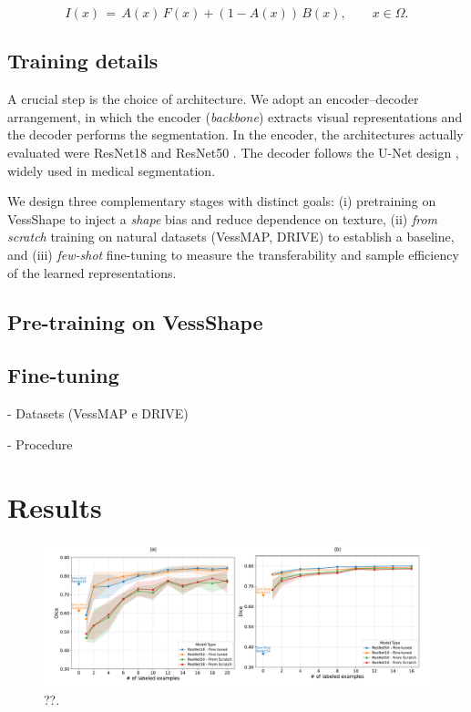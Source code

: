 \documentclass[%
reprint,
nofootinbib,
 amsmath,amssymb,
aps,
superscriptaddress,
showkeys,
longbibliography
]{revtex4-1}
\begin{document}
\begin{equation}
I(x) \,=\, A(x)\,F(x) + (1-A(x))\,B(x), \qquad x \in \Omega.
\label{eq:compose}
\end{equation}





\subsection{Training details}

A crucial step is the choice of architecture. We adopt an encoder–decoder arrangement, in which the encoder (\emph{backbone}) extracts visual representations and the decoder performs the segmentation. In the encoder, the architectures actually evaluated were ResNet18 and ResNet50 \cite{}. The decoder follows the U-Net design \cite{}, widely used in medical segmentation.

We design three complementary stages with distinct goals: (i) pretraining on VessShape to inject a \emph{shape} bias and reduce dependence on texture, (ii) \emph{from scratch} training on natural datasets (VessMAP, DRIVE) to establish a baseline, and (iii) \emph{few-shot} fine-tuning to measure the transferability and sample efficiency of the learned representations.

\subsection{Pre-training on VessShape}




\subsection{Fine-tuning}

- Datasets (VessMAP e DRIVE)

- Procedure

\section{Results}
\label{s:results}

\begin{figure}[tbp]
    \centering
    \includegraphics[width=\textwidth]{figures/results/results_charts.pdf}
    \caption{??.}
    \label{f:results_charts}
\end{figure}
\end{document}
